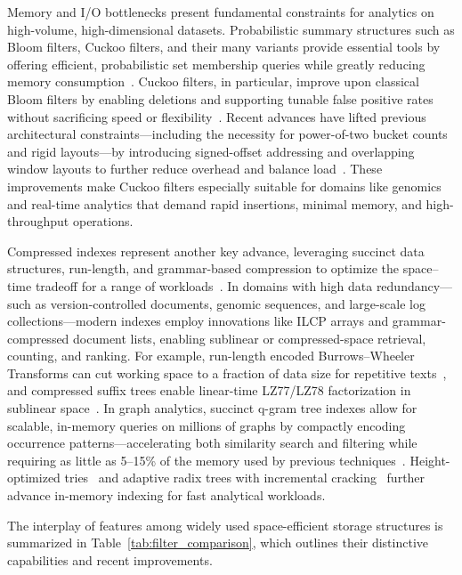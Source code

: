 \documentclass[sigconf]{acmart}
\begin{document}
Memory and I/O bottlenecks present fundamental constraints for analytics on high-volume, high-dimensional datasets. Probabilistic summary structures such as Bloom filters, Cuckoo filters, and their many variants provide essential tools by offering efficient, probabilistic set membership queries while greatly reducing memory consumption~\cite{ref80,ref81,ref82,ref87,ref106,ref108,ref109,ref118}. Cuckoo filters, in particular, improve upon classical Bloom filters by enabling deletions and supporting tunable false positive rates without sacrificing speed or flexibility~\cite{ref81,ref82}. Recent advances have lifted previous architectural constraints—including the necessity for power-of-two bucket counts and rigid layouts—by introducing signed-offset addressing and overlapping window layouts to further reduce overhead and balance load~\cite{ref87}. These improvements make Cuckoo filters especially suitable for domains like genomics and real-time analytics that demand rapid insertions, minimal memory, and high-throughput operations.

Compressed indexes represent another key advance, leveraging succinct data structures, run-length, and grammar-based compression to optimize the space--time tradeoff for a range of workloads~\cite{ref80,ref81,ref87,ref106,ref108,ref118}. In domains with high data redundancy—such as version-controlled documents, genomic sequences, and large-scale log collections—modern indexes employ innovations like ILCP arrays and grammar-compressed document lists, enabling sublinear or compressed-space retrieval, counting, and ranking. For example, run-length encoded Burrows–Wheeler Transforms can cut working space to a fraction of data size for repetitive texts~\cite{ref80}, and compressed suffix trees enable linear-time LZ77/LZ78 factorization in sublinear space~\cite{ref81}. In graph analytics, succinct q-gram tree indexes allow for scalable, in-memory queries on millions of graphs by compactly encoding occurrence patterns—accelerating both similarity search and filtering while requiring as little as 5–15\% of the memory used by previous techniques~\cite{ref106}. Height-optimized tries~\cite{ref108} and adaptive radix trees with incremental cracking~\cite{ref109} further advance in-memory indexing for fast analytical workloads.

The interplay of features among widely used space-efficient storage structures is summarized in Table~\ref{tab:filter_comparison}, which outlines their distinctive capabilities and recent improvements.
\end{document}

